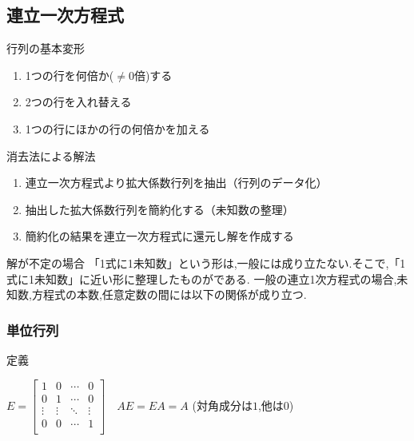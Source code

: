 \documentclass[a4paper]{jsarticle}
\begin{document}
\subsection{連立一次方程式}
\begin{itembox}[l]{行列の基本変形}
    \begin{enumerate}[(1)]
        \item 1つの行を何倍か($\neq0$倍)する
        \item 2つの行を入れ替える
        \item 1つの行にほかの行の何倍かを加える
    \end{enumerate}
\end{itembox}
\begin{itembox}[l]{消去法による解法}
    \begin{enumerate}[(1)]
        \item 連立一次方程式より拡大係数行列を抽出（行列のデータ化）
        \item 抽出した拡大係数行列を簡約化する（未知数の整理）
        \item 簡約化の結果を連立一次方程式に還元し解を作成する
    \end{enumerate}
\end{itembox}
\begin{itembox}[l]{解が不定の場合}
    「1式に1未知数」という形は,一般には成り立たない.そこで,「1式に1未知数」に近い形に整理したものがである.
    一般の連立1次方程式の場合,未知数,方程式の本数,任意定数の間には以下の関係が成り立つ.
    \begin{center}
    \end{center}
\end{itembox}
\subsubsection{単位行列}
\begin{itembox}[l]{定義}
    \begin{center}
        $E=
            \begin{bmatrix}
                1      & 0      & \cdots & 0      \\
                0      & 1      & \cdots & 0      \\
                \vdots & \vdots & \ddots & \vdots \\
                0      & 0      & \cdots & 1      \\
            \end{bmatrix}
            \quad AE=EA=A
        $
        \quad(対角成分は$1$,他は$0$)
    \end{center}
\end{itembox}
\end{document}
